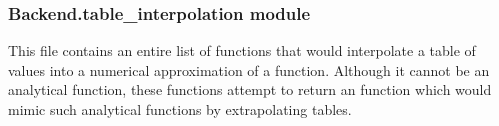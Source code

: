\documentclass[letterpaper,10pt,english]{sphinxmanual}
\begin{document}
\subsubsection{Backend.table\_interpolation module}
\label{\detokenize{Backend.table_interpolation:module-Backend.table_interpolation}}\label{\detokenize{Backend.table_interpolation:backend-table-interpolation-module}}\label{\detokenize{Backend.table_interpolation::doc}}
This file contains an entire list of functions that would interpolate
a table of values into a numerical approximation of a function. Although
it cannot be an analytical function, these functions attempt to return an
function which would mimic such analytical functions by extrapolating tables.
\end{document}
